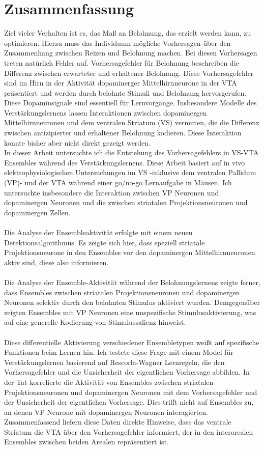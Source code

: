 \section*{Zusammenfassung}
Ziel vieler Verhalten ist es, das Maß an Belohnung, das erzielt werden kann, zu optimieren. Hierzu muss das Individuum mögliche Vorhersagen über den Zusammenhang zwischen Reizen und Belohnung machen.  Bei diesen Vorhersagen treten natürlich Fehler auf. Vorhersagefehler für Belohnung beschreiben die Differenz zwischen erwarteter und erhaltener Belohnung. Diese Vorhersagefehler sind im Hirn in der Aktivität dopaminerger Mittelhirnneurone in der VTA präsentiert und werden durch belohnte Stimuli und Belohnung hervorgerufen. Diese Dopaminsignale sind essentiell für Lernvorgänge. Insbesondere Modelle des Verstärkungslernens lassen Interaktionen zwischen dopaminergen Mittelhirnneuronen und dem ventralen Striatum (VS) vermuten, die die Differenz zwischen antizipierter und erhaltener Belohnung kodieren. Diese Interaktion konnte bisher aber nicht direkt gezeigt werden.\\In dieser Arbeit untersuchte ich die Entstehung des Vorhersagefehlers in VS-VTA Ensembles während des Verstärkungslernens. Diese Arbeit basiert auf in vivo elektrophysiologischen Untersuchungen im VS -inklusive dem ventralen Pallidum (VP)- und der VTA während einer go/no-go Lernaufgabe in Mäusen. Ich untersuchte insbesondere die Interaktion zwischen VP Neuronen und dopaminergen Neuronen und die zwischen striatalen Projektionsneuronen und dopaminergen Zellen.\\\\Die Analyse der Ensembleaktivität erfolgte mit einem neuen Detektionsalgorithmus. Es zeigte sich hier, dass speziell striatale Projektionsneurone in den Ensembles vor den dopaminergen Mittelhirnneuronen aktiv sind, diese also informieren.\\\\Die Analyse der Ensemble-Aktivität während der Belohnungslernens zeigte ferner, dass Ensembles zwischen striatalen Projektionsneuronen und dopaminergen Neuronen selektiv durch den belohnten Stimulus aktiviert wurden. Demgegenüber zeigten Ensembles mit VP Neuronen eine unspezifische Stimulusaktivierung, was auf eine generelle Kodierung von Stimulussalienz hinweist.\\\\Diese differentielle Aktivierung verschiedener Ensembletypen weißt auf spezifische Funktionen beim Lernen hin. Ich testete diese Frage mit einem Model für Verstärkungslernen basierend auf Rescorla-Wagner Lernregeln, die den Vorhersagefehler und die Unsicherheit der eigentlichen Vorhersage abbilden. In der Tat korrelierte die Aktivität von Ensembles zwischen striatalen Projektionsneuronen und dopaminergen Neuronen mit dem Vorhersagefehler und der Unsicherheit der eigentlichen Vorhersage. Dies trifft nicht auf Ensembles zu, an denen VP Neurone mit dopaminergen Neuronen interagierten. Zusammenfassend liefern diese Daten direkte Hinweise, dass das ventrale Striatum die VTA über den Vorhersagefehler informiert, der in den interarealen Ensembles zwischen beiden Arealen repräsentiert ist.
